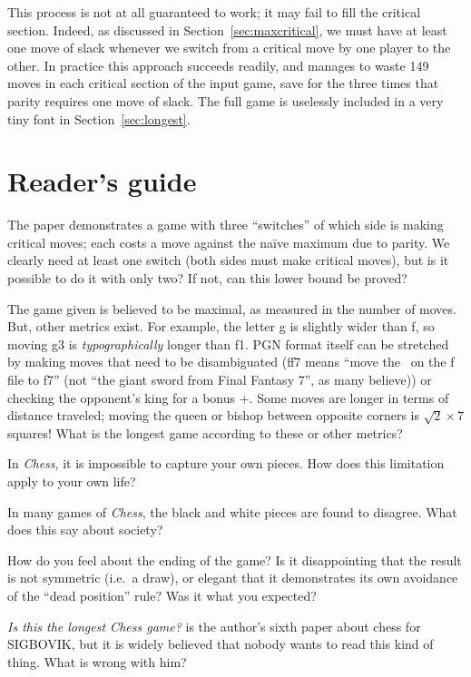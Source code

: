 \documentclass[twocolumn]{article}
\newcommand{\Bishop}[1][1.79ex]{%
\adjustbox{Trim=2.3pt 2pt 2.3pt 0pt,width=#1,raise=-0.12ex,margin=0.1ex 0ex 0.1ex 0ex}{\BlackBishopOnWhite}%
}%
\newcommand{\Queen}[1][2.05ex]{%
\adjustbox{Trim=1.2pt 2.2pt 1.2pt 0pt,width=#1,raise=-0.08ex,margin=0.1ex 0ex 0.1ex 0ex}{\BlackQueenOnWhite}%
}%
\begin{document}
This process is not at all guaranteed to work; it may fail to fill the
critical section. Indeed, as discussed in
Section~\ref{sec:maxcritical}, we must have at least one move of slack
whenever we switch from a critical move by one player to the other.
In practice this approach succeeds readily, and manages to waste 149
moves in each critical section of the input game, save for the three
times that parity requires one move of slack. The full game is uselessly
included in a very tiny font in Section~\ref{sec:longest}.

\section{Reader's guide}

The paper demonstrates a game with three ``switches'' of which side is
making critical moves; each costs a move against the na\"ive maximum
due to parity. We clearly need at least one switch (both sides must
make critical moves), but is it possible to do it with only two? If
not, can this lower bound be proved?

\smallskip
The game given is believed to be maximal, as measured in the number of
moves. But, other metrics exist. For example, the letter g is slightly
wider than f, so moving \Queen g3 is {\em typographically} longer than
\Bishop f1. PGN format itself can be stretched by making moves that
need to be disambiguated (\bishop ff7 means ``move the \bishop\ on the
f file to f7'' (not ``the giant sword from Final Fantasy 7'', as many
believe)) or checking the opponent's king for a bonus +. Some moves
are longer in terms of distance traveled; moving the queen or bishop
between opposite corners is $\sqrt{2} \times 7$ squares! What is the
longest game according to these or other metrics?


\smallskip
In {\it Chess}, it is impossible to capture your own pieces. How does
this limitation apply to your own life?

\smallskip
In many games of {\it Chess}, the black and white pieces are found to
disagree. What does this say about society?

\smallskip
How do you feel about the ending of the game? Is it disappointing that
the result is not symmetric (i.e.~a draw), or elegant that it
demonstrates its own avoidance of the ``dead position'' rule? Was it
what you expected?

\smallskip
{\it Is this the longest Chess game?} is the author's sixth paper
about chess for SIGBOVIK, but it is widely believed that nobody wants
to read this kind of thing. What is wrong with him?
\end{document}
